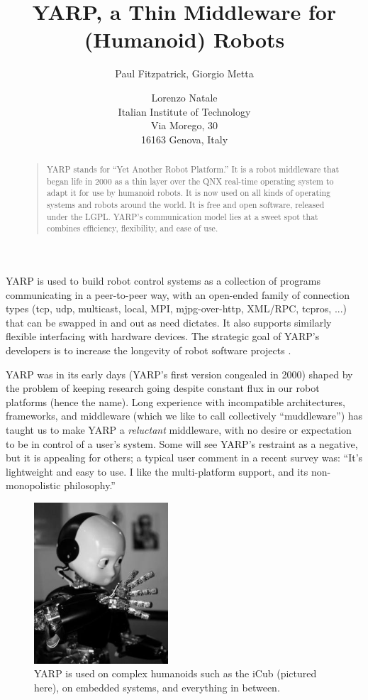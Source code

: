\documentclass[letterpaper]{article}
\title{YARP, a Thin Middleware for (Humanoid) Robots}
\author{Paul Fitzpatrick{\rm ,} Giorgio Metta \and Lorenzo Natale \\
Italian Institute of Technology \\
Via Morego, 30 \\16163 Genova, Italy}
\begin{document}
 
\maketitle
\begin{abstract}
\begin{quote}

YARP stands for ``Yet Another Robot Platform.''  It is a robot
middleware that began life in 2000 as a thin layer over the QNX
real-time operating system to adapt it for use by humanoid robots.  It
is now used on all kinds of operating systems and robots around the
world.  It is free and open software, released under the LGPL.
YARP's communication model lies at a sweet spot that combines
efficiency, flexibility, and ease of use.

\end{quote}
\end{abstract}

\noindent 

YARP is used to build robot control systems as a collection of
programs communicating in a peer-to-peer way, with an open-ended
family of connection types (tcp, udp, multicast, local, MPI,
mjpg-over-http, XML/RPC, tcpros, ...) that can be swapped in and out
as need dictates.
It also supports similarly flexible interfacing
with hardware devices.  The strategic goal
of YARP's developers is to increase the longevity
of robot software projects \cite{fitzpatrick08towards}.

YARP was in its early days (YARP's first version congealed in 2000)
shaped by the problem of keeping research going despite constant flux
in our robot platforms (hence the name).  Long experience with
incompatible architectures, frameworks, and middleware (which we like
to call collectively ``muddleware'') has taught us to make YARP a {\it
  reluctant} middleware, with no desire or expectation to be in
control of a user's system.  Some will see YARP's restraint as a
negative, but it is appealing for others; a typical user comment in a
recent survey was: ``It's lightweight and easy to use. I like the
multi-platform support, and its non-monopolistic philosophy.''

\begin{figure}
\centerline{\includegraphics[width=5cm]{icub.jpg}}
\caption{YARP is used on
complex humanoids such as the iCub (pictured here),
on embedded systems, and everything in between.
} 
\end{figure}
\end{document}
